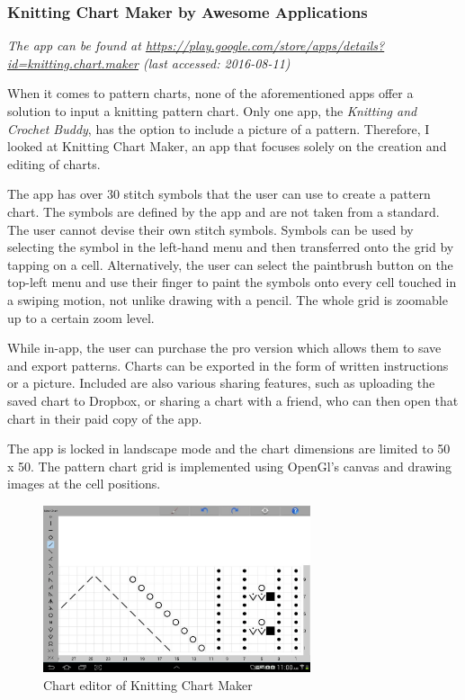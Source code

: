 \subsubsection*{Knitting Chart Maker by Awesome Applications}

\textit{The app can be found at \url{https://play.google.com/store/apps/details?id=knitting.chart.maker} \small{(last accessed: 2016-08-11)}}
\vspace*{0.5cm}

\noindent When it comes to pattern charts, none of the aforementioned apps offer a solution to input a knitting pattern chart. Only one app, the \textit{Knitting and Crochet Buddy}, has the option to include a picture of a pattern. Therefore, I looked at Knitting Chart Maker, an app that focuses solely on the creation and editing of charts.

The app has over 30 stitch symbols that the user can use to create a pattern chart. The symbols are defined by the app and are not taken from a standard. The user cannot devise their own stitch symbols. Symbols can be used by selecting the symbol in the left-hand menu and then transferred onto the grid by tapping on a cell. Alternatively, the user can select the paintbrush button on the top-left menu and use their finger to paint the symbols onto every cell touched in a swiping motion, not unlike drawing with a pencil. The whole grid is zoomable up to a certain zoom level.

While in-app, the user can purchase the pro version which allows them to save and export patterns. Charts can be exported in the form of written instructions or a picture. Included are also various sharing features, such as uploading the saved chart to Dropbox, or sharing a chart with a friend, who can then open that chart in their paid copy of the app.

The app is locked in landscape mode and the chart dimensions are limited to 50 x 50. The pattern chart grid is implemented using OpenGl’s canvas and drawing images at the cell positions.

\begin{figure}[H]
  \begin{center}
\includegraphics[width=0.7\textwidth]{images/image03.png}
\caption[Chart editor of Knitting Chart Maker ]{Chart editor of Knitting Chart Maker}
\label{fig_knittingchartmaker}
\end{center}
\end{figure}


